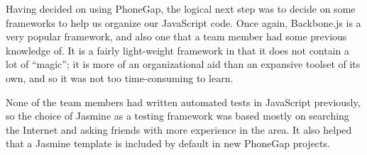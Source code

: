 Having decided on using PhoneGap, the logical next step was to decide on some
frameworks to help us organize our JavaScript code. Once again, Backbone.js is
a very popular framework, and also one that a team member had some previous
knowledge of. It is a fairly light-weight framework in that it does not contain
a lot of ``magic''; it is more of an organizational aid than an expansive
toolset of its own, and so it was not too time-consuming to learn.

None of the team members had written automated tests in JavaScript previously,
so the choice of Jasmine as a testing framework was based mostly on searching
the Internet and asking friends with more experience in the area. It also
helped that a Jasmine template is included by default in new PhoneGap projects.

\begin{figure}[!ht]
\centering


\end{figure}
